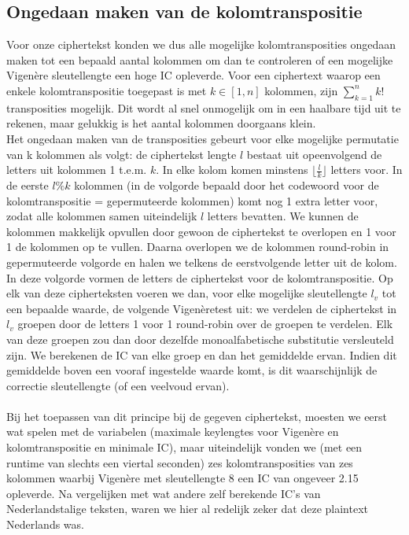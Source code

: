 \subsection{Ongedaan maken van de kolomtranspositie}
Voor onze ciphertekst konden we dus alle mogelijke kolomtransposities ongedaan maken tot een bepaald aantal kolommen om dan te controleren of een mogelijke Vigen\`ere sleutellengte een hoge IC opleverde. Voor een ciphertext waarop een enkele kolomtranspositie toegepast is met $k \in [1,n]$ kolommen, zijn $\sum_{k=1}^{n}k!$ transposities mogelijk. Dit wordt al snel onmogelijk om in een haalbare tijd uit te rekenen, maar gelukkig is het aantal kolommen doorgaans klein. \\
Het ongedaan maken van de transposities gebeurt voor elke mogelijke permutatie van k kolommen als volgt: de ciphertekst lengte $l$ bestaat uit opeenvolgend de letters uit kolommen 1 t.e.m. $k$. In elke kolom komen minstens $\lfloor\frac{l}{k}\rfloor$ letters voor. In de eerste $l\%k$ kolommen (in de volgorde bepaald door het codewoord voor de kolomtranspositie = gepermuteerde kolommen) komt nog 1 extra letter voor, zodat alle kolommen samen uiteindelijk $l$ letters bevatten. We kunnen de kolommen makkelijk opvullen door gewoon de ciphertekst te overlopen en 1 voor 1 de kolommen op te vullen. Daarna overlopen we de kolommen round-robin in gepermuteerde volgorde en halen we telkens de eerstvolgende letter uit de kolom. In deze volgorde vormen de letters de ciphertekst voor de kolomtranspositie. Op elk van deze cipherteksten voeren we dan, voor elke mogelijke sleutellengte $l_v$ tot een bepaalde waarde, de volgende Vigen\`eretest uit: we verdelen de ciphertekst in $l_v$ groepen door de letters 1 voor 1 round-robin over de groepen te verdelen. Elk van deze groepen zou dan door dezelfde monoalfabetische substitutie versleuteld zijn. We berekenen de IC van elke groep en dan het gemiddelde ervan. Indien dit gemiddelde boven een vooraf ingestelde waarde komt, is dit waarschijnlijk de correctie sleutellengte (of een veelvoud ervan). \\ \\ Bij het toepassen van dit principe bij de gegeven ciphertekst, moesten we eerst wat spelen met de variabelen (maximale keylengtes voor Vigen\`ere en kolomtranspositie en minimale IC), maar uiteindelijk vonden we (met een runtime van slechts een viertal seconden) zes kolomtransposities van zes kolommen waarbij Vigen\`ere met sleutellengte 8 een IC van ongeveer 2.15 opleverde. Na vergelijken met wat andere zelf berekende IC's van Nederlandstalige teksten, waren we hier al redelijk zeker dat deze plaintext Nederlands was. 

